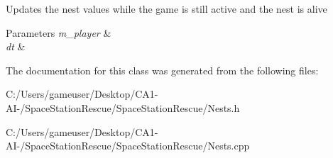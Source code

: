 Updates the nest values while the game is still active and the nest is alive 


\begin{DoxyParams}{Parameters}
{\em m\+\_\+player} & \\
\hline
{\em dt} & \\
\hline
\end{DoxyParams}


The documentation for this class was generated from the following files\+:\begin{DoxyCompactItemize}
\item 
C\+:/\+Users/gameuser/\+Desktop/\+C\+A1-\/\+A\+I-\//\+Space\+Station\+Rescue/\+Space\+Station\+Rescue/Nests.\+h\item 
C\+:/\+Users/gameuser/\+Desktop/\+C\+A1-\/\+A\+I-\//\+Space\+Station\+Rescue/\+Space\+Station\+Rescue/Nests.\+cpp\end{DoxyCompactItemize}
